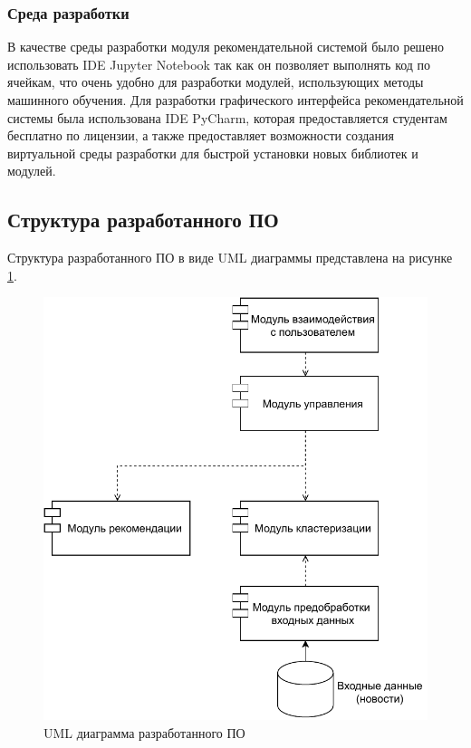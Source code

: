 \subsubsection{Среда разработки}

В качестве среды разработки модуля рекомендательной системой было решено использовать IDE Jupyter Notebook так как он позволяет выполнять код по ячейкам, что очень удобно для разработки модулей, использующих методы машинного обучения. Для разработки графического интерфейса рекомендательной системы была использована IDE PyCharm, которая предоставляется студентам бесплатно по лицензии, а также предоставляет возможности создания виртуальной среды разработки для быстрой установки новых библиотек и модулей.

\subsection{Структура разработанного ПО}

Структура разработанного ПО в виде UML диаграммы представлена на рисунке \ref{uml}.

\begin{figure}[H]
	\centering
	\includegraphics[width=\textwidth]{img/UML.pdf}
	\caption{UML диаграмма разработанного ПО}
	\label{uml}
\end{figure}  

